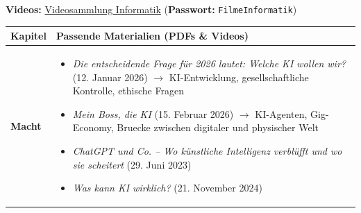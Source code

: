 \noindent
\textbf{Videos:} \href{https://cvb.synology.me:5001/d/s/11QxlSoKIKc3fd1xPi7rD4o9xUfriMVH/Zu7mRnEeIx1XPU-wvav24IlXmIu5I9D6-CLngzwnQ6gs}{\faPlayCircle{} Videosammlung Informatik} (\textbf{Passwort:} \texttt{FilmeInformatik})

\vspace{0.4cm}

\footnotesize
\begin{longtable}{@{}lp{14cm}@{}}
	\toprule
	\textbf{Kapitel} & \textbf{Passende Materialien (PDFs \& Videos)} \\
	\midrule\midrule
	
	\textbf{Macht} & 
	\begin{itemize}[leftmargin=*,noitemsep,topsep=0pt]
		\item[\faFilePdf{}] \textit{Die entscheidende Frage für 2026 lautet: Welche KI wollen wir?} (12. Januar 2026) \newline
		$\rightarrow$ KI-Entwicklung, gesellschaftliche Kontrolle, ethische Fragen
		\item[\faFilePdf{}] \textit{Mein Boss, die KI} (15. Februar 2026) \newline
		$\rightarrow$ KI-Agenten, Gig-Economy, Bruecke zwischen digitaler und physischer Welt
		\item[\faPlayCircle{}] \textit{ChatGPT und Co. -- Wo künstliche Intelligenz verblüfft und wo sie scheitert} (29. Juni 2023) \href{https://www.srf.ch/play/tv/einstein/video/chatgpt-und-co----wo-kuenstliche-intelligenz-verbluefft-und-wo-sie-scheitert?urn=urn:srf:video:3c267144-f388-4474-83fc-a8d09676c94a}{\faLink}
		\item[\faPlayCircle{}] \textit{Was kann KI wirklich?} (21. November 2024) \href{https://www.srf.ch/play/tv/einstein/video/was-kann-ki-wirklich?urn=urn:srf:video:9c65b2f1-abaa-4583-9ddf-17e1a7743c2d}{\faLink}
	\end{itemize} \\
	\midrule
	

\end{longtable}
